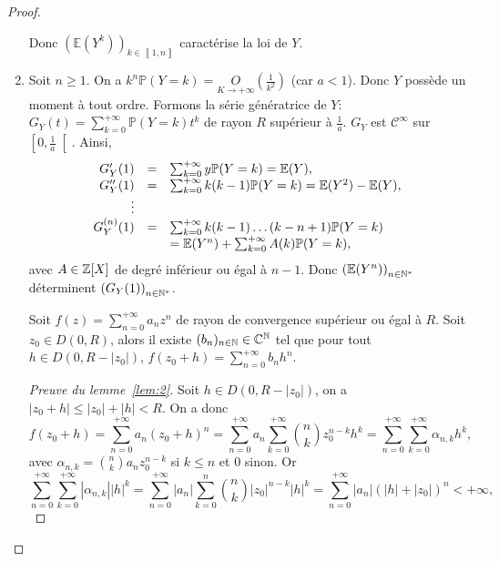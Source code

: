 \documentclass[12pt]{article}
\begin{document}
\begin{proof}
\begin{enumerate}
        Donc $\left(\mathbb{E}(Y^{k})\right)_{k\in\left\llbracket1,n\right\rrbracket}$ caractérise la loi de $Y$.

        \item Soit $n\geqslant1$. On a $k^{n}\mathbb{P}(Y=k)=\underset{K\to+\infty}{O}\left(\frac{1}{k^{2}}\right)$ (car $a<1$). Donc $Y$ possède un moment à tout ordre. Formons la série génératrice de $Y$: $G_Y(t)=\sum_{k=0}^{+\infty}\mathbb{P}\left(Y=k\right)t^{k}$ de rayon $R$ supérieur à $\frac{1}{a}$. $G_Y$ est $\mathcal{C}^{\infty}$ sur $\left[0,\frac{1}{a}\right[$. Ainsi,
        \begin{equation}
            \begin{array}[]{rcl}
                G_Y'(1) &=&\sum_{k=0}^{+\infty}y\mathbb{P}(Y=k)=\mathbb{E}(Y),\\
                G_Y''(1) &=& \sum_{k=0}^{+\infty}k(k-1)\mathbb{P}(Y=k)=\mathbb{E}(Y^{2})-\mathbb{E}(Y),\\
                \vdots\\
                G_Y^{(n)}(1) &=& \sum_{k=0}^{+\infty}k(k-1)\dots(k-n+1)\mathbb{P}(Y=k)\\
                &&=\mathbb{E}(Y^{n})+\sum_{k=0}^{+\infty}A(k)\mathbb{P}(Y=k),
            \end{array}
        \end{equation}
        avec $A\in\mathbb{Z}[X]$ de degré inférieur ou égal à $n-1$. Donc $\left(\mathbb{E}(Y^{n})\right)_{n\in\mathbb{N}^{*}}$ déterminent $\left(G_Y(1)\right)_{n\in\mathbb{N}^{*}}$.

        \begin{lemma}
            \label{lem:2}
            Soit $f(z)=\sum_{n=0}^{+\infty}a_nz^{n}$ de rayon de convergence supérieur ou égal à $R$. Soit $z_0\in D(0,R)$, alors il existe $(b_n)_{n\in\mathbb{N}}\in\mathbb{C}^{\mathbb{N}}$ tel que pour tout $h\in D(0,R-\left\lvert z_0\right\rvert)$, $f(z_{0}+h)=\sum_{n=0}^{+\infty}b_n h^{n}$.
        \end{lemma}
        \begin{proof}[Preuve du lemme~\ref{lem:2}]
            Soit $h\in D(0,R-\left\lvert z_0\right\rvert)$, on a $\left\lvert z_{0}+h\right\rvert\leqslant\left\lvert z_0\right\rvert+\left\lvert h\right\rvert<R$. On a donc 
            \begin{equation}
                f(z_{0}+h)=\sum_{n=0}^{+\infty}a_n (z_{0}+h)^{n}=\sum_{n=0}^{+\infty}a_n\sum_{k=0}^{+\infty}\binom{n}{k}z_{0}^{n-k}h^{k}=\sum_{n=0}^{+\infty}\sum_{k=0}^{+\infty}\alpha_{n,k}h^{k},
            \end{equation}
            avec $\alpha_{n,k}=\binom{n}{k}a_nz_{0}^{n-k}$ si $k\leqslant n$ et 0 sinon. Or 
            \begin{equation}
                \sum_{n=0}^{+\infty}\sum_{k=0}^{+\infty}\left\lvert \alpha_{n,k}\right\rvert\left\lvert h\right\rvert^{k}=\sum_{n=0}^{+\infty}\left\lvert a_n\right\rvert\sum_{k=0}^{n}\binom{n}{k}\left\lvert z_{0}\right\rvert^{n-k}\left\lvert h\right\rvert^{k}=\sum_{n=0}^{+\infty}\left\lvert a_n\right\rvert\left(\left\lvert h\right\rvert+\left\lvert z_{0}\right\rvert\right)^{n}<+\infty,
            \end{equation}
            

\end{proof}
\end{enumerate}
\end{proof}
\end{document}
